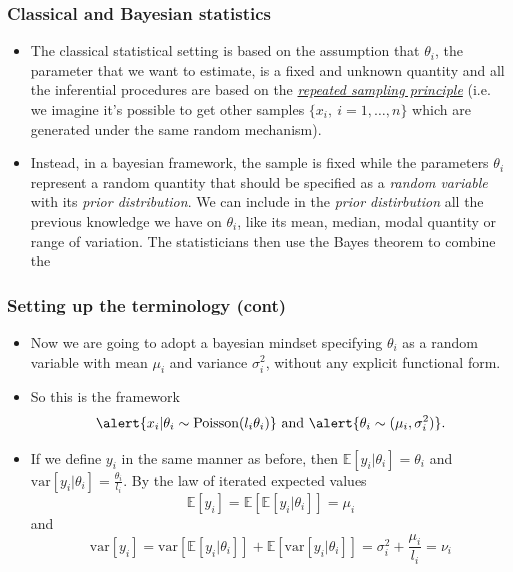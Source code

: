 \documentclass[c,10pt,pdftex]{beamer}
\begin{document}
\begin{frame}
\frametitle{Classical and Bayesian statistics}
\vspace{-0.75cm}
\begin{itemize}
	\setlength\itemsep{1em}
	\item The classical statistical setting is based on the assumption that $\theta_i$, the parameter that we want to estimate, is a fixed and unknown quantity and all the inferential procedures are based on the \href{https://www.facebook.com/BayesianStatisticsBrokeMyPockets/photos/a.168432696942117/311094049342647/?type=3\&theater}{\textit{repeated sampling principle}} (i.e. we imagine it's possible to get other samples $\lbrace x_i, \ i = 1,\dots,n \rbrace$ which are generated under the same random mechanism). 
	\item Instead, in a bayesian framework, the sample is fixed while the parameters $\theta_i$ represent a random quantity that should be specified as a \textit{random variable} with its \textit{prior distribution}. We can include in the \textit{prior distirbution} all the previous knowledge we have on $\theta_{i}$, like its mean, median, modal quantity or range of variation. The statisticians then use the Bayes theorem to combine the 
\end{itemize}
\end{frame}

\begin{frame}
\frametitle{Setting up the terminology (cont)}
\vspace{-0.75cm}
\begin{itemize}
	\setlength\itemsep{1em}
	\item Now we are going to adopt a \alert{bayesian mindset} specifying $\theta_i$ as a random variable with mean $\mu_i$ and variance $\sigma^2_i$, without any explicit functional form. 
	
	\item So this is the framework 
	\[
	\alert{x_i | \theta_i \sim \text{Poisson}(l_i\theta_i)} \text{ and } \alert{\theta_i \sim (\mu_i, \sigma^2_i)}. 
	\]  
	
	\item If we define $y_i$ in the same manner as before, then $\mathbb{E}[y_i | \theta_i] = \theta_i$ and $\text{var}[y_i | \theta_i] = \frac{\theta_{i}}{l_i}$. By the law of iterated expected values 
	\[
	\mathbb{E}[y_i] = \mathbb{E}[\mathbb{E}[y_i|\theta_{i}]] = \mu_i
	\]
	and
	\[
	\text{var}[y_i] = \text{var}[\mathbb{E}[y_i | \theta_i]] + \mathbb{E}[\text{var}[y_i|\theta_{i}]] = \sigma^2_i + \frac{\mu_i}{l_i} = \nu_i
	\]
\end{itemize}
\end{frame}
\end{document}
